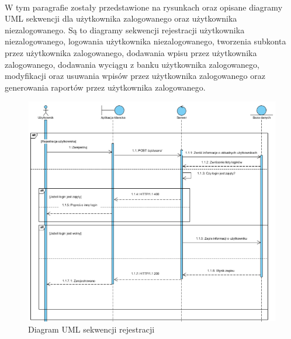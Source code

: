 \documentclass{article}
\begin{document}
	\paragraph*{} W tym paragrafie zostały przedstawione na rysunkach oraz opisane diagramy UML sekwencji dla użytkownika zalogowanego oraz użytkownika niezalogowanego. Są to diagramy sekwencji rejestracji użytkownika niezalogowanego, logowania użytkownika niezalogowanego, tworzenia subkonta przez użytkownika zalogowanego, dodawania wpisu przez użytkownika zalogowanego, dodawania wyciągu z banku użytkownika zalogowanego, modyfikacji oraz usuwania wpisów przez użytkownika zalogowanego oraz generowania raportów przez użytkownika zalogowanego.
	\begin{figure}[H]
		\hspace*{-2.5cm} 
		\includegraphics[scale=0.9]{assets/sq1.png}
		\caption[]{Diagram UML sekwencji rejestracji}
		\label{fig:umlreje}
	\end{figure} 
\end{document}
